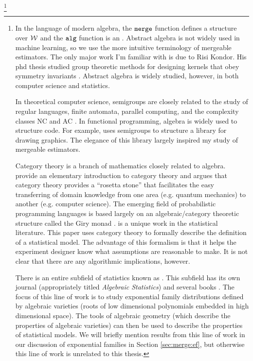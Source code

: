\documentclass[thesis.tex]{subfiles}
\newcommand{\merge}{\mkprocedure{merge}}
\newcommand{\alg}{\mkprocedure{alg}}
\begin{document}
\footnote{
    In the language of modern algebra,
    the $\merge$ function defines a  structure over ${\mathcal W}$ and the $\alg$ function is an .
    Abstract algebra is not widely used in machine learning,
    so we use the more intuitive terminology of mergeable estimators.
    The only major work I'm familiar with is due to Risi Kondor.
    His phd thesis studied group theoretic methods for designing kernels that obey symmetry invariants \citep{kondor2008group}.
    Abstract algebra is widely studied, however, in both computer science and statistics.

    In theoretical computer science, 
    semigroups are closely related to the study of regular languages, 
    finite automata, 
    parallel computing,
    and the complexity classes NC and AC
    \citep{tesson2004monoids,tesson2006bridges}.
    In functional programming, algebra is widely used to structure code.
    For example, \citet{yorgey2012monoids} uses semigroups to structure a library for drawing graphics.
    The elegance of this library largely inspired my study of mergeable estimators.

    Category theory is a branch of mathematics closely related to algebra.
    \citet{baez2010physics} provide an elementary introduction to category theory and argues that category theory provides a ``rosetta stone'' that facilitates the easy transferring of domain knowledge from one area (e.g. quantum mechanics) to another (e.g. computer science).
    The emerging field of probabilistic programming languages is based largely on an algebraic/category theoretic structure called the Giry monad \citep[e.g.][]{erwig2006functional,ramsey2002stochastic,pfeffer2009figaro,scibior2015practical}.
    \citet{mccullagh2002statistical} is a unique work in the statistical literature.
    This paper uses category theory to formally describe the definition of a statistical model.
    The advantage of this formalism is that it helps the experiment designer know what assumptions are reasonable to make.
    It is not clear that there are any algorithmic implications, however.


    There is an entire subfield of statistics known as .
    This subfield has its own journal (appropriately titled \emph{Algebraic Statistics}) 
    and several books \citep{pachter2005algebraic,drton2008lectures,sullivant2017algebraic}.
    The focus of this line of work is to study exponential family distributions defined by algebraic varieties (roots of low dimensional polynomials embedded in high dimensional space).
    The tools of algebraic geometry (which describe the properties of algebraic varieties)
    can then be used to describe the properties of statistical models.
    We will briefly mention results from this line of work in our discussion of exponential families in Section \ref{sec:merge:ef},
    but otherwise this line of work is unrelated to this thesis.

}
\end{document}
